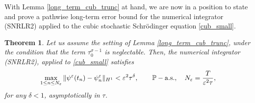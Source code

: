 \documentclass[a4paper]{amsart}
\newtheorem{theorem}{Theorem}[section]
\newtheorem{lemma}[theorem]{Lemma}
\begin{document}
With Lemma \ref{long_term_cub_trunc} at hand, we are now in a position to state and prove a pathwise long-term error bound for the numerical integrator (SNRLR2) applied to the cubic stochastic Schrödinger equation \eqref{cub_small}.
\begin{theorem}
\label{long_term_path_orig_cub}
    Let us assume the setting of Lemma \ref{long_term_cub_trunc}, under the condition that the term $\tau_0^{\sigma-1}$ is neglectable. Then, the numerical integrator (SNRLR2), applied to \eqref{cub_small} satisfies 
    $$
    \max_{1\le n \le N_\varepsilon}\| \psi^\varepsilon(t_n)-\psi^\varepsilon_n\|_{H^1}<\varepsilon^2\tau^\delta, \qquad \mathbb{P}-{\rm a.s.}, \quad N_\varepsilon=\frac{T}{\varepsilon^2 \tau},
    $$
    for any $\delta<1$, asymptotically in $\tau$.
\end{theorem}
\end{document}
